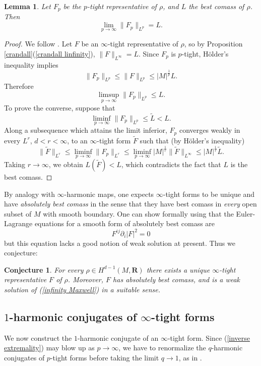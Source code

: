\documentclass[reqno,11pt]{amsart}
\newcommand{\RR}{\mathbf{R}}
\newcommand{\dfn}[1]{\emph{#1}\index{#1}}
\newtheorem{lemma}[theorem]{Lemma}
\newtheorem{conjecture}[theorem]{Conjecture}
\theoremstyle{definition}
\numberwithin{equation}{section}
\begin{document}
\begin{lemma}\label{p tights approximate L}
Let $F_p$ be the $p$-tight representative of $\rho$, and $L$ the best comass of $\rho$. Then 
$$\lim_{p \to \infty} \|F_p\|_{L^p} = L.$$
\end{lemma}
\begin{proof}
We follow \cite[Lemma 2.7]{daskalopoulos2020transverse}.
Let $F$ be an $\infty$-tight representative of $\rho$, so by Proposition \ref{crandall}(\ref{crandall linfinity}), $\|F\|_{L^\infty} = L$.
Since $F_p$ is $p$-tight, H\"older's inequality implies 
$$\|F_p\|_{L^p} \leq \|F\|_{L^p} \leq |M|^{\frac{1}{p}} L.$$
Therefore 
$$\limsup_{p \to \infty} \|F_p\|_{L^p} \leq L.$$
To prove the converse, suppose that 
$$\liminf_{p \to \infty} \|F_p\|_{L^p} \leq \tilde L < L.$$
Along a subsequence which attains the limit inferior, $F_p$ converges weakly in every $L^r$, $d < r < \infty$, to an $\infty$-tight form $\tilde F$ such that (by H\"older's inequality)
$$\|\tilde F\|_{L^r} \leq \liminf_{p \to \infty} \|F_p\|_{L^r} \leq \liminf_{p \to \infty} |M|^{\frac{1}{r}} \|\tilde F\|_{L^\infty} \leq |M|^{\frac{1}{r}} \tilde L.$$
Taking $r \to \infty$, we obtain $L(\tilde F) < L$, which contradicts the fact that $L$ is the best comass.
\end{proof}

By analogy with $\infty$-harmonic maps, one expects $\infty$-tight forms to be unique and have \dfn{absolutely best comass} in the sense that they have best comass in \emph{every} open subset of $M$ with smooth boundary.
One can show formally using \cite[Theorem 5.2]{Barron2001} that the Euler-Lagrange equations for a smooth form of absolutely best comass are
\begin{equation}\label{infinity Maxwell}
	F^{ij} \partial_i |F|^2 = 0
\end{equation}
but this equation lacks a good notion of weak solution at present.
Thus we conjecture:

\begin{conjecture}
For every $\rho \in H^{d - 1}(M, \RR)$ there exists a unique $\infty$-tight representative $F$ of $\rho$.
Moreover, $F$ has absolutely best comass, and is a weak solution of (\ref{infinity Maxwell}) in a suitable sense.
\end{conjecture}


\subsection{\texorpdfstring{$1$-harmonic conjugates of $\infty$-tight forms}{One-harmonic conjugates of infinity-tight forms}}
We now construct the $1$-harmonic conjugate of an $\infty$-tight form.
Since (\ref{inverse extremality}) may blow up as $p \to \infty$, we have to renormalize the $q$-harmonic conjugates of $p$-tight forms before taking the limit $q \to 1$, as in \cite[\S3.2]{daskalopoulos2020transverse}.
\end{document}
